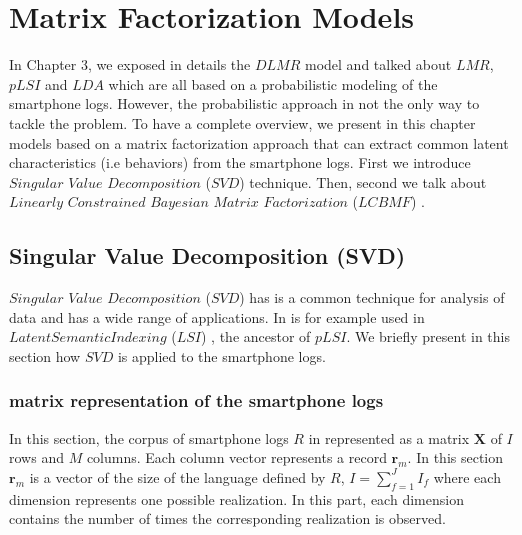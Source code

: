 
\chapter{Matrix Factorization Models} %

\label{Matrix Factorization Models} %


In Chapter 3, we exposed in details the $DLMR$ model and talked about $LMR$, $pLSI$ and $LDA$ which are all based on a probabilistic modeling of the smartphone logs. However, the probabilistic approach in not the only way to tackle the problem. To have a complete overview, we present in this chapter models based on a matrix factorization approach that can extract common latent characteristics (i.e behaviors) from the smartphone logs. First we introduce $Singular$ $Value$ $Decomposition$ ($SVD$) \cite{svd} technique. Then, second we talk about $Linearly$ $Constrained$ $Bayesian$ $Matrix$ $Factorization$ ($LCBMF$) \cite{lcbmf}.

\section{Singular Value Decomposition (SVD)}

$Singular$ $Value$ $Decomposition$ ($SVD$) \cite{svd} has is a common technique for analysis of data and has a wide range of applications. In is for example used in $Latent Semantic Indexing$ ($LSI$) \cite{lsi}, the ancestor of $pLSI$. We briefly present in this section how $SVD$ is applied to the smartphone logs.


\subsection{matrix representation of the smartphone logs} \label{4.1.1}

In this section, the corpus of smartphone logs $R$ in represented as a matrix $\boldsymbol{X}$ of $I$ rows and $M$ columns. Each column vector represents a record $\mathbf{r}_{m}$. In this section $\mathbf{r}_{m}$ is a vector of the size of the language defined by $R$, $I=\sum_{f=1}^{J}I_{f}$ where each dimension represents one possible realization.  In this part, each dimension contains the number of times the corresponding realization is observed. \par

